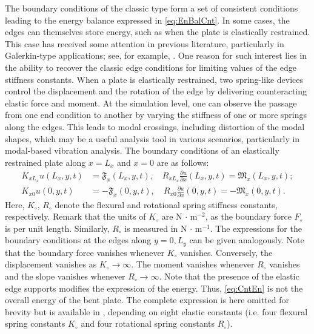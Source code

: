 The boundary conditions of the classic type form a set of consistent conditions leading to the energy balance expressed in \eqref{eq:EnBalCnt}. In some cases, the edges can themselves store energy, such as when the plate is elastically restrained. This case has received some attention in previous literature, particularly in Galerkin-type applications; see, for example, \cite{li2009exact,zhang2009vibrations,li2000free}. One reason for such interest lies in the ability to recover the classic edge conditions for limiting values of the edge stiffness constants. When a plate is elastically restrained, two spring-like devices control the displacement and the rotation of the edge by delivering counteracting elastic force and moment. At the simulation level, one can observe the passage from one end condition to another by varying the stiffness of one or more springs along the edges. This leads to modal crossings, including distortion of the modal shapes, which may be a useful analysis tool in various scenarios, particularly in modal-based vibration analysis. The boundary conditions of an elastically restrained plate along $x=L_x$ and $x=0$ are as follows:
\begin{subequations}
\begin{align}
K_{xL_x} u(L_x,y,t) &= {\mathfrak F}_x(L_x,y,t), \quad R_{xL_x} \frac{\partial u}{\partial x}(L_x,y,t) = {\mathfrak M}_x(L_x,y,t); \\
K_{x0} u(0,y,t) &= -{\mathfrak F}_x(0,y,t), \quad R_{x0} \frac{\partial u}{\partial x}(0,y,t) = -{\mathfrak M}_x(0,y,t).\label{eq:BCsCnt2}
\end{align}
\end{subequations}
Here, $K_\circ$, $R_{\circ}$ denote the flexural and rotational spring stiffness constants, respectively. Remark that the units of $K_\circ$ are N $\cdot$ m$^{-2}$, as the boundary force $F_\circ$ is per unit length. Similarly, $R_{\circ}$ is measured in N $\cdot$ m$^{-1}$.
The expressions for the boundary conditions at the edges along $y=0,L_y$ can be given analogously. Note that the boundary force vanishes whenever $K_\circ$ vanishes. Conversely, the displacement vanishes as $K_\circ \rightarrow \infty$. The moment vanishes whenever $R_{\circ}$ vanishes and the slope vanishes whenever $R_\circ \rightarrow \infty$. Note that the presence of the elastic edge supports modifies the expression of the energy. Thus, \eqref{eq:CntEn} is not the overall energy of the bent plate. The complete expression is here omitted for brevity but is available in \cite{szilardBook}, depending on eight elastic constants (i.e. four flexural spring constants $K_\circ$ and four rotational spring constants $R_\circ$).


